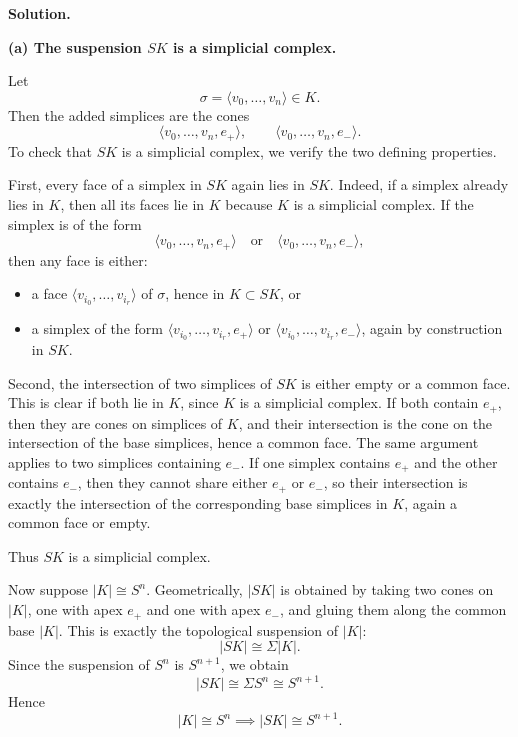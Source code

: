 \documentclass[12pt,a4paper]{article}
\theoremstyle{notespace}
\begin{document}
\textbf{Solution.}

\medskip

\textbf{(a) The suspension \(SK\) is a simplicial complex.}

Let
\[
\sigma=\langle v_0,\dots,v_n\rangle\in K.
\]
Then the added simplices are the cones
\[
\langle v_0,\dots,v_n,e_+\rangle,
\qquad
\langle v_0,\dots,v_n,e_-\rangle.
\]
To check that \(SK\) is a simplicial complex, we verify the two defining properties.

First, every face of a simplex in \(SK\) again lies in \(SK\). Indeed, if a simplex already lies in \(K\), then all its faces lie in \(K\) because \(K\) is a simplicial complex. If the simplex is of the form
\[
\langle v_0,\dots,v_n,e_+\rangle
\quad\text{or}\quad
\langle v_0,\dots,v_n,e_-\rangle,
\]
then any face is either:

\begin{itemize}
	\item a face \(\langle v_{i_0},\dots,v_{i_r}\rangle\) of \(\sigma\), hence in \(K\subset SK\), or
	\item a simplex of the form \(\langle v_{i_0},\dots,v_{i_r},e_+\rangle\) or \(\langle v_{i_0},\dots,v_{i_r},e_-\rangle\), again by construction in \(SK\).
\end{itemize}

Second, the intersection of two simplices of \(SK\) is either empty or a common face. This is clear if both lie in \(K\), since \(K\) is a simplicial complex. If both contain \(e_+\), then they are cones on simplices of \(K\), and their intersection is the cone on the intersection of the base simplices, hence a common face. The same argument applies to two simplices containing \(e_-\). If one simplex contains \(e_+\) and the other contains \(e_-\), then they cannot share either \(e_+\) or \(e_-\), so their intersection is exactly the intersection of the corresponding base simplices in \(K\), again a common face or empty.

Thus \(SK\) is a simplicial complex.

\medskip

Now suppose \(|K|\cong S^n\). Geometrically, \(|SK|\) is obtained by taking two cones on \(|K|\), one with apex \(e_+\) and one with apex \(e_-\), and gluing them along the common base \(|K|\). This is exactly the topological suspension of \(|K|\):
\[
|SK|\cong \Sigma |K|.
\]
Since the suspension of \(S^n\) is \(S^{n+1}\), we obtain
\[
|SK|\cong \Sigma S^n\cong S^{n+1}.
\]
Hence
\[
\boxed{|K|\cong S^n \implies |SK|\cong S^{n+1}.}
\]
\end{document}
